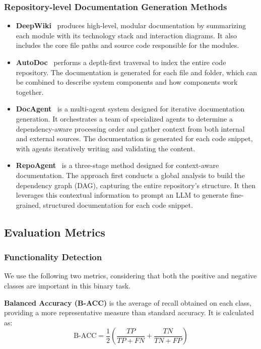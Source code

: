 \subsubsection{Repository-level Documentation Generation Methods}
\begin{itemize}[leftmargin=*]
    \item \textbf{DeepWiki}~\cite{deepwiki} produces high-level, modular documentation by summarizing each module with its technology stack and interaction diagrams. It also includes the core file paths and source code responsible for the modules.
    \item \textbf{AutoDoc}~\cite{autodoc} performs a depth-first traversal to index the entire code repository. The documentation is generated for each file and folder, which can be combined to describe system components and how components work together.
    \item \textbf{DocAgent}~\cite{docagent} is a multi-agent system designed for iterative documentation generation. It orchestrates a team of specialized agents to determine a dependency-aware processing order and gather context from both internal and external sources. The documentation is generated for each code snippet, with agents iteratively writing and validating the content.
   \item \textbf{RepoAgent}~\cite{repoagent} is a three-stage method designed for context-aware documentation. The approach first conducts a global analysis to build the dependency graph (DAG), capturing the entire repository's structure. It then leverages this contextual information to prompt an LLM to generate fine-grained, structured documentation for each code snippet.
\end{itemize}

\subsection{Evaluation Metrics}

\subsubsection{Functionality Detection}
We use the following two metrics, considering that both the positive and negative classes are important in this binary task.

\textbf{Balanced Accuracy (B-ACC)} is the average of recall obtained on each class, providing a more representative measure than standard accuracy. It is calculated as:
\begin{equation}
    \text{B-ACC} = \frac{1}{2} \left( \frac{TP}{TP+FN} + \frac{TN}{TN+FP} \right)
\end{equation}
    
